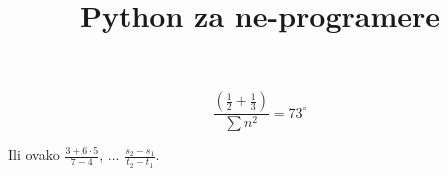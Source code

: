 \documentclass[12pt,oneside,a4paper]{report}
\title{Python za ne-programere}
\begin{document}
$$\frac{\left( \frac 12 + \frac 13 \right)}{\sum n^2}=73^\circ$$

Ili ovako
$\displaystyle \frac{3+6\cdot 5}{7-4}$,
...
$\displaystyle \frac{s_2-s_1}{t_2-t_1}$.
\end{document}
